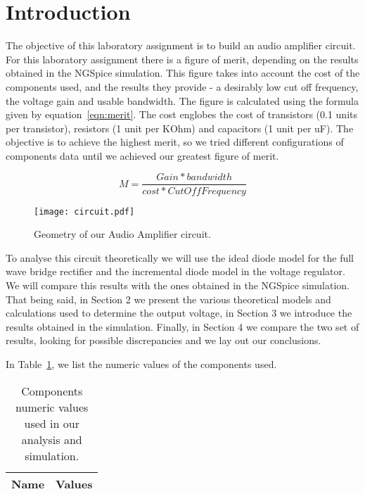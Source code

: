 \section{Introduction}
\label{sec:introduction}
The objective of this laboratory assignment is to build an audio amplifier circuit. 
For this laboratory assignment there is a figure of merit, depending on the results obtained in the NGSpice simulation. This figure takes into account the cost of the components used, and the results they provide - a desirably low cut off frequency, the voltage gain and usable bandwidth. The figure is calculated using the formula given by equation~\ref{eqn:merit}. The cost englobes the cost of transistors (0.1 units per transistor), resistors (1 unit per KOhm) and capacitors (1 unit per uF). The objective is to achieve the highest merit, so we tried different configurations of components data until we achieved our greatest figure of merit.

\begin{equation}
\label{eqn:merit}
M=\frac{Gain*bandwidth}{cost*CutOffFrequency}
\end{equation}

\begin{figure}[h] \centering
\texttt{[image: circuit.pdf]}
\caption{Geometry of our Audio Amplifier circuit.}
\end{figure}

To analyse this circuit theoretically we will use the ideal diode model for the full wave bridge rectifier and the incremental diode model in the voltage regulator. We will compare this results with the ones obtained in the NGSpice simulation.
That being said, in Section 2 we present the various theoretical models and calculations used to determine the output voltage, in Section 3 we introduce the results obtained in the simulation. Finally, in Section 4 we compare the two set of results, looking for possible discrepancies and we lay out our conclusions.

In Table~\ref{tab:data}, we list the numeric values of the components used.

\begin{table}[h]
  \centering
  \begin{tabular}{|l|r|}
    \hline    
    {\bf Name} & {\bf Values} \\ \hline
     
  \end{tabular}
  \caption{Components numeric values used in our analysis and simulation.}
  \label{tab:data}
\end{table}
